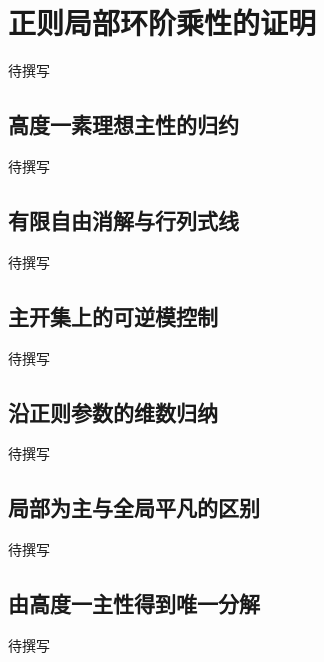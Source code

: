 
% 
% 

\section{正则局部环阶乘性的证明}
\label{g5:sec:0905}

待撰写

\subsection{高度一素理想主性的归约}
\label{g5:subsec:0905:01}
待撰写

\subsection{有限自由消解与行列式线}
\label{g5:subsec:0905:02}
待撰写

\subsection{主开集上的可逆模控制}
\label{g5:subsec:0905:03}
待撰写

\subsection{沿正则参数的维数归纳}
\label{g5:subsec:0905:04}
待撰写

\subsection{局部为主与全局平凡的区别}
\label{g5:subsec:0905:05}
待撰写

\subsection{由高度一主性得到唯一分解}
\label{g5:subsec:0905:06}
待撰写
